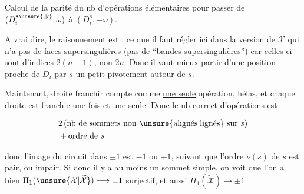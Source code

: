 Calcul de la parité du nb d'opérations élémentaires pour passer de $(D_i^{s\unsure{,|\prime}},\omega)$ à $(D_i^{s},-\omega)$.





A vrai dire, le raisonnement est ,  ce que il faut régler ici dans la version de $\mathcal X$ qui n'a pas de faces supersingulières (pas de ``bandes supersingulières'') car celles-ci sont d'indices $2(n-1)$, non $2n$. Donc il vaut mieux partir d'une position proche de $D_i$  par $s$  un petit pivotement autour de $s$.

Maintenant,  droite  franchir compte comme \uline{une seule} opération, hélas, et chaque droite   est franchie une fois et une seule. Donc le nb correct d'opérations est

\[ \begin{aligned}
&2\,(\text{nb de sommets non \unsure{alignés|lignés} sur }s)\\
&+\text{ordre de }s
\end{aligned} \]

donc l'image du circuit dans $\pm1$ est $-1$ ou $+1$, suivant que l'ordre  $\nu(s)$ de $s$ est pair, ou impair. Si donc il y a au moins un sommet simple, on voit que l'on a bien $\Pi_1(\unsure{\mathcal X|\widetilde{\mathcal X}})\longrightarrow\pm1$ surjectif, et aussi $\Pi_1(\widetilde{\mathcal X})\longrightarrow\pm1$ 

